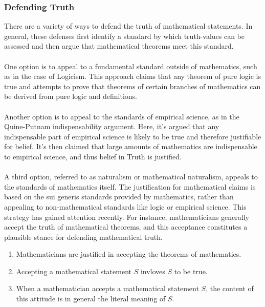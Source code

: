 \documentclass[10pt,a4paper]{article}
\newcounter{theo}
\begin{document}
                    \subsubsection{Defending Truth}
                        There are a variety of ways to defend the truth of mathematical statements. In general, these defenses first identify a standard by which truth-values can be assessed and then argue that mathematical theorems meet this standard.
                        \\
                        \\
                        One option is to appeal to a fundamental standard outside of mathematics, such as in the case of Logicism. This approach claims that any theorem of pure logic is true and attempts to prove that theorems of certain branches of mathematics can be derived from pure logic and definitions.
                        \\
                        \\
                        Another option is to appeal to the standards of empirical science, as in the Quine-Putnam indispensability argument. Here, it's argued that any indispensable part of empirical science is likely to be true and therefore justifiable for belief. It's then claimed that large amounts of mathematics are indispensable to empirical science, and thus belief in Truth is justified.
                        \\
                        \\
                        A third option, referred to as naturalism or mathematical naturalism, appeals to the standards of mathematics itself. The justification for mathematical claims is based on the sui generis standards provided by mathematics, rather than appealing to non-mathematical standards like logic or empirical science. This strategy has gained attention recently. For instance, mathematicians generally accept the truth of mathematical theorems, and this acceptance constitutes a plausible stance for defending mathematical truth.
                        \begin{enumerate}
                            \item Mathematicians are justified in accepting the theorems of mathematics.
                            \item Accepting a mathematical statement $S$ invloves $S$ to be true.
                            \item When a mathematician accepts a mathematical statement $S$, the content of this attitude is in general the literal meaning of $S$.
                        \end{enumerate}
\end{document}

